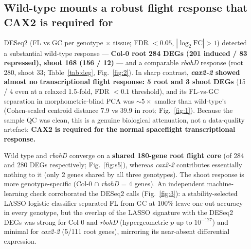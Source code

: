 \documentclass[pdflatex,sn-nature]{sn-jnl}
\begin{document}
\subsection{Wild-type mounts a robust flight response that CAX2 is required for}
DESeq2 (FL vs GC per genotype \(\times\) tissue; FDR \(< 0.05\), \(|\log_2\text{FC}|
> 1\)) detected a substantial wild-type response --- \textbf{Col-0 root 284 DEGs
(201 induced / 83 repressed), shoot 168 (156 / 12)} --- and a comparable
\textit{rbohD} response (root 280, shoot 33; Table~\ref{tab:deg},
Fig.~\ref{fig:2}). In sharp contrast, \textbf{\textit{cax2-2} showed almost no
transcriptional flight response: 5 root and 3 shoot DEGs} (15 / 4 even at a relaxed
1.5-fold, FDR \(< 0.1\) threshold), and its FL-vs-GC separation in
morphometric-blind PCA was \(\sim 5\times\) smaller than wild-type's (Cohen-scaled
centroid distance 7.9 vs 39.9 in root; Fig.~\ref{fig:1}). Because the sample QC was
clean, this is a genuine biological attenuation, not a data-quality artefact:
\textbf{CAX2 is required for the normal spaceflight transcriptional response.}

Wild type and \textit{rbohD} converge on a \textbf{shared 180-gene root flight
core} (of 284 and 280 DEGs respectively; Fig.~\ref{fig:s5}), whereas \textit{cax2-2}
contributes essentially nothing to it (only 2 genes shared by all three genotypes).
The shoot response is more genotype-specific (Col-0 \(\cap\) \textit{rbohD} = 4
genes). An independent machine-learning check corroborated the DESeq2 calls
(Fig.~\ref{fig:3}): a stability-selected LASSO logistic classifier separated FL from
GC at 100\% leave-one-out accuracy in every genotype, but the overlap of the LASSO
signature with the DESeq2 DEGs was strong for Col-0 and \textit{rbohD}
(hypergeometric \(p\) up to \(10^{-127}\)) and minimal for \textit{cax2-2} (5/111
root genes), mirroring its near-absent differential expression.
\end{document}
